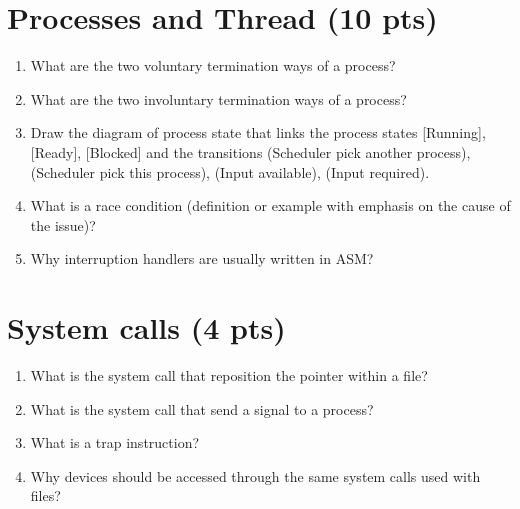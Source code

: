 \documentclass[11pt]{article}
\begin{document}
\section{Processes and Thread (10 pts)}
	\begin{enumerate}
		\item What are the two voluntary termination ways of a process? %
		\vspace{1cm}
		\item What are the two involuntary termination ways of a process? %
		\vspace{1cm}
		\item Draw the diagram of process state that links the process states [Running], [Ready], [Blocked] and the transitions (Scheduler pick another process), (Scheduler pick this process), (Input available), (Input required). %
		\vspace{5cm}
		\item What is a race condition (definition or example with emphasis on the cause of the issue)? %
		\vspace{3cm}
		\item Why interruption handlers are usually written in ASM?
		\vspace{1cm}
	\end{enumerate}

\section{System calls (4 pts)}
	\begin{enumerate}
		\item What is the system call that reposition the pointer within a file? %
		\vspace{1cm}
		\item What is the system call that send a signal to a process? %
		\vspace{1cm}
		\item What is a trap instruction? %
		\vspace{1cm}
		\item Why devices should be accessed through the same system calls used with files? %
		\vspace{1cm}
	\end{enumerate}
\end{document}
